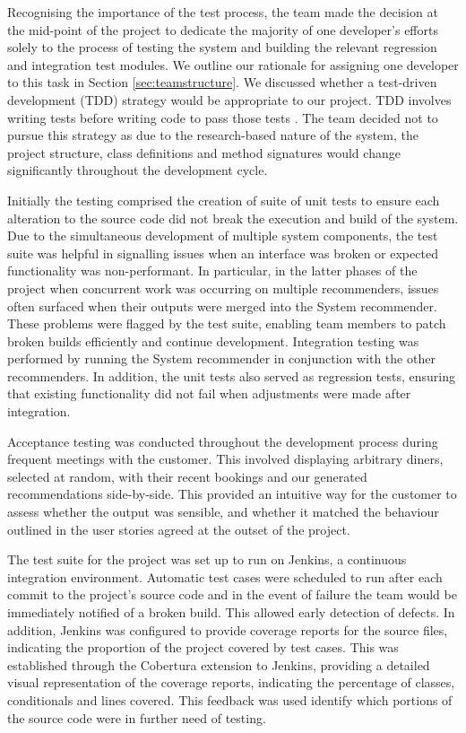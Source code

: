 \documentclass{l3proj}
\begin{document}
Recognising the importance of the test process, the team made the decision at the mid-point of the project to dedicate the majority of one developer's efforts solely to the process of testing the system and building the relevant regression and integration test modules. We outline our rationale for assigning one developer to this task in Section \ref{sec:teamstructure}. We discussed whether a test-driven development (TDD) strategy would be appropriate to our project. TDD involves writing tests before writing code to pass those tests \cite{TDD}. The team decided not to pursue this strategy as due to the research-based nature of the system, the project structure, class definitions and method signatures would change significantly throughout the development cycle. 

Initially the testing comprised the creation of suite of unit tests to ensure each alteration to the source code did not break the execution and build of the system. Due to the simultaneous development of multiple system components, the test suite was helpful in signalling issues when an interface was broken or expected functionality was non-performant. In particular, in the latter phases of the project when concurrent work was occurring on multiple recommenders, issues often surfaced when their outputs were merged into the System recommender. These problems were flagged by the test suite, enabling team members to patch broken builds efficiently and continue development. Integration testing was performed by running the System recommender in conjunction with the other recommenders. In addition, the unit tests also served as regression tests, ensuring that existing functionality did not fail when adjustments were made after integration.

Acceptance testing was conducted throughout the development process during frequent meetings with the customer. This involved displaying arbitrary diners, selected at random, with their recent bookings and our generated recommendations side-by-side. This provided an intuitive way for the customer to assess whether the output was sensible, and whether it matched the behaviour outlined in the user stories agreed at the outset of the project.

The test suite for the project was set up to run on Jenkins, a continuous integration environment. Automatic test cases were scheduled to run after each commit to the project's source code and in the event of failure the team would be immediately notified of a broken build. This allowed early detection of defects. In addition, Jenkins was configured to provide coverage reports for the source files, indicating the proportion of the project covered by test cases. This was established through the Cobertura extension to Jenkins,  providing a detailed visual representation of the coverage reports, indicating the percentage of classes, conditionals and lines covered. This feedback was used identify which portions of the source code were in further need of testing.
\end{document}

